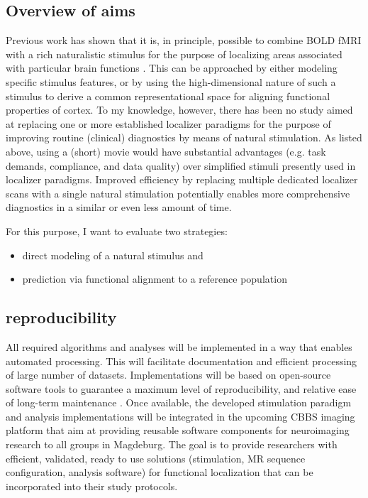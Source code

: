 \subsection{Overview of aims}
%
Previous work has shown that it is, in principle, possible to combine BOLD fMRI
with a rich naturalistic stimulus for the purpose of localizing areas associated
with particular brain functions \citep{bartels2004mapping}.
%
This can be approached by either modeling specific stimulus features, or by
using the high-dimensional nature of such a stimulus to derive a common
representational space for aligning functional properties of cortex.
%
To my knowledge, however, there has been no study aimed at replacing one or more
established localizer paradigms for the purpose of improving routine (clinical)
diagnostics by means of natural stimulation.
%
As listed above, using a (short) movie would have substantial advantages (e.g.
task demands, compliance, and data quality) over simplified stimuli presently
used in localizer paradigms.
%
Improved efficiency by replacing multiple dedicated localizer scans with a
single natural stimulation potentially enables more comprehensive diagnostics in
a similar or even less amount of time.

%
For this purpose, I want to evaluate two strategies:

\begin{itemize}
    \item direct modeling of a natural stimulus and
    \item prediction via functional alignment to a reference population
\end{itemize}


\subsection{reproducibility}

%
All required algorithms and analyses will be implemented in a way that enables
automated processing.
%
This will facilitate documentation and efficient processing of large number of
datasets.
%
Implementations will be based on open-source software tools to guarantee a
maximum level of reproducibility, and relative ease of long-term maintenance
\citep{eglen2017toward}.
%
Once available, the developed stimulation paradigm and analysis implementations
will be integrated in the upcoming CBBS imaging platform that aim at providing
reusable software components for neuroimaging research to all groups in
Magdeburg.
%
The goal is to provide researchers with efficient, validated, ready to use
solutions (stimulation, MR sequence configuration, analysis software) for
functional localization that can be incorporated into their study protocols.


